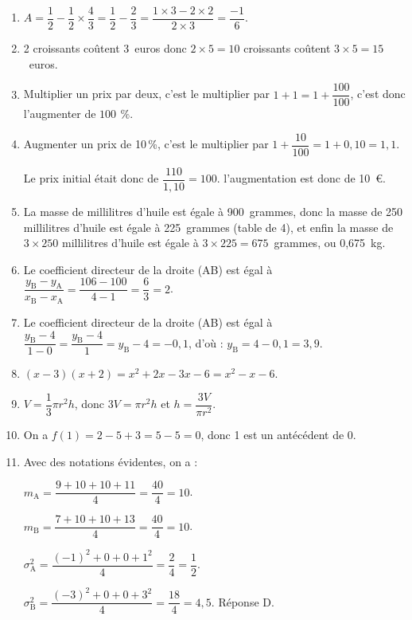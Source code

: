 \begin{enumerate}
\item $A = \dfrac 12 - \dfrac 12 \times \dfrac 43 = \dfrac 12 - \dfrac23 = \dfrac{1 \times 3 - 2 \times 2}{2 \times 3} = \dfrac{-1}{6}$.
\item 2 croissants coûtent 3~euros donc $2 \times 5 = 10$ croissants coûtent $3  \times 5 = 15$~euros.
\item Multiplier un prix par deux, c'est le multiplier par $1 + 1 = 1 + \dfrac{100}{100}$, c'est donc l'augmenter de $100~\,\%$.
\item Augmenter un prix de 10\,\%, c'est le multiplier par $1 + \dfrac{10}{100} = 1 + 0,10 = 1,1$.

Le prix initial était donc de $\dfrac{110}{1,10} = 100$. l'augmentation est donc de 10~\euro.
\item La masse de  millilitres d'huile est égale à 900~grammes, donc la masse de 250  millilitres d'huile est égale à 225~grammes (table de 4), et enfin la masse de $3 \times 250$ millilitres d'huile est égale à $3 \times 225 = 675$~grammes, ou 0,675~kg.
\item Le coefficient directeur de la droite (AB) est égal à $\dfrac{y_{\text{B}} - y_{\text{A}}}{x_{\text{B}} - x_{\text{A}}} = \dfrac{106 - 100 }{4 - 1} = \dfrac 63 = 2$.
\item Le coefficient directeur de la droite (AB) est égal à $\dfrac{y_{\text{B}} - 4}{1 -  0} = \dfrac{y_{\text{B}} - 4}{1} = y_{\text{B}} - 4 = - 0,1$, d'où :
$y_{\text{B}} = 4 - 0,1 = 3,9$.
\item $(x - 3)(x + 2) = x^2  + 2x - 3x - 6 = x^2 - x - 6$.
\item $V = \dfrac 13 \pi r^2 h$, donc $3V = \pi r^2 h$ et $h = \dfrac{3V}{\pi r^2}$.
\item On a $f(1) = 2 - 5 + 3 = 5 - 5 = 0$, donc 1 est un antécédent de 0.
\item Avec des notations évidentes, on a :

$m_{\text{A}} = \dfrac{9 + 10 + 10 + 11}{4} = \dfrac{40}{4} = 10$.

$m_{\text{B}} = \dfrac{7 + 10 + 10 + 13}{4} = \dfrac{40}{4} = 10$.

$\sigma_{\text{A}}^2 = \dfrac{(- 1)^2 + 0 + 0 + 1^2}{4} = \dfrac{2}{4} = \dfrac12$.

$\sigma_{\text{B}}^2 = \dfrac{(- 3)^2  + 0 + 0 + 3^2}{4} = \dfrac{18}{4} = 4,5$. Réponse D.
\end{enumerate}

\medskip
